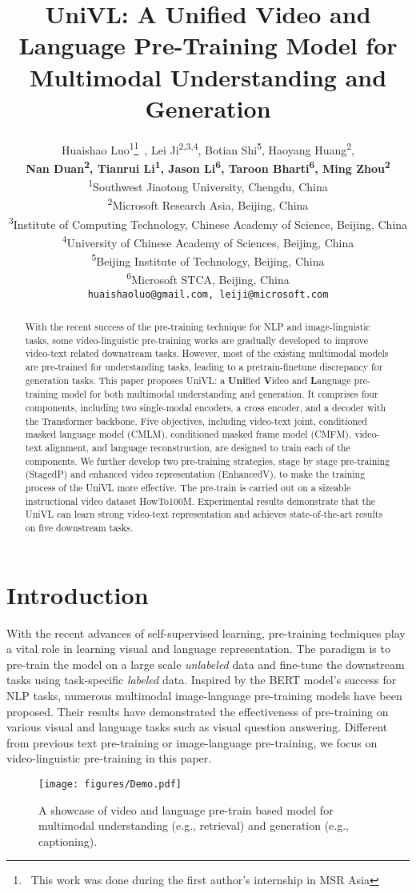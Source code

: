 \documentclass[11pt,a4paper]{article}
\title{UniVL: A Unified Video and Language Pre-Training Model for Multimodal Understanding and Generation}
\author{
	Huaishao Luo\textsuperscript{1}\thanks{~This work was done during the first author's internship in MSR Asia}~, 
	Lei Ji\textsuperscript{2,3,4}, 
	Botian Shi\textsuperscript{5}, 
	Haoyang Huang\textsuperscript{2}, \\
	{\bf Nan Duan\textsuperscript{2}, 
	Tianrui Li\textsuperscript{1}, 
	Jason Li\textsuperscript{6},
	Taroon Bharti\textsuperscript{6}, 
	Ming Zhou\textsuperscript{2}} \\
\textsuperscript{1}Southwest Jiaotong University, Chengdu, China\\
  \textsuperscript{2}Microsoft Research Asia, Beijing, China \\ 
  \textsuperscript{3}Institute of Computing Technology, Chinese Academy of Science, Beijing, China  \\
  \textsuperscript{4}University of Chinese Academy of Sciences, Beijing, China  \\
  \textsuperscript{5}Beijing Institute of Technology, Beijing, China  \\
  \textsuperscript{6}Microsoft STCA, Beijing, China  \\
	{\tt huaishaoluo@gmail.com, leiji@microsoft.com}
}
\begin{document}
	\maketitle
	\begin{abstract}
		With the recent success of the pre-training technique for NLP and image-linguistic tasks, some video-linguistic pre-training works are gradually developed to improve video-text related downstream tasks. However, most of the existing multimodal models are pre-trained for understanding tasks, leading to a pretrain-finetune discrepancy for generation tasks. This paper proposes UniVL: a \textbf{Uni}fied \textbf{V}ideo and \textbf{L}anguage pre-training model for both multimodal understanding and generation. It comprises four components, including two single-modal encoders, a cross encoder, and a decoder with the Transformer backbone. Five objectives, including video-text joint, conditioned masked language model (CMLM), conditioned masked frame model (CMFM), video-text alignment, and language reconstruction, are designed to train each of the components. We further develop two pre-training strategies, stage by stage pre-training (StagedP) and enhanced video representation (EnhancedV), to make the training process of the UniVL more effective. The pre-train is carried out on a sizeable instructional video dataset HowTo100M. Experimental results demonstrate that the UniVL can learn strong video-text representation and achieves state-of-the-art results on five downstream tasks.
	\end{abstract}
	
	\section{Introduction}
	With the recent advances of self-supervised learning, pre-training techniques play a vital role in learning visual and language representation. The paradigm is to pre-train the model on a large scale \emph{unlabeled} data and fine-tune the downstream tasks using task-specific \emph{labeled} data. Inspired by the BERT \cite{devlin2019bert} model's success for NLP tasks, numerous multimodal image-language pre-training models \cite{lu2019vilbert,li2019unicoder,li2019visualbert} have been proposed. Their results have demonstrated the effectiveness of pre-training on various visual and language tasks such as visual question answering. Different from previous text pre-training or image-language pre-training, we focus on video-linguistic pre-training in this paper.
	\begin{figure}[tp] 
		\centering
		\texttt{[image: figures/Demo.pdf]} 
		\caption{A showcase of video and language pre-train based model for multimodal understanding (e.g., retrieval) and generation (e.g., captioning).}
		\label{fig:showcase}
	\end{figure}
	
\end{document}

